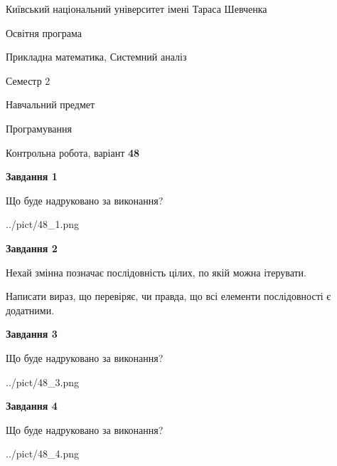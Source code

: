 \documentclass[12pt, ukrainian]{article}
\begin{document}
{{\begin {small}\par
{ \center  Київський національний університет імені Тараса Шевченка \par}
{\parbox {5 cm}{Освітня програма \hfill}{\parbox {8 cm}{Прикладна математика, Системний аналіз \hfill}}\parbox {5 cm}{\hfill Семестр 2}}\par
{\parbox {5 cm} {Навчальний предмет \hfill}\parbox {7 cm}{Програмування \hfill}\parbox {6cm}{\hfill}\par}\vspace{-7pt} \end{small}}{\center Контрольна робота, варіант  \No \textbf
{ 48 }\par}}
{
\begin {large}
{\begin {center}\textbf{Завдання 1}\end {center}}\par
Що буде надруковано за виконання?\par\par
\begin{center}
	{../pict/48_1.png}
\end{center}
\newpage

{\begin {center}\textbf{Завдання 2}\end {center}}\par
Нехай змінна  позначає послідовність цілих, по якій можна ітерувати.

Написати вираз, що перевіряє, чи правда, що всі елементи послідовності є додатни\-ми.\par
\newpage

{\begin {center}\textbf{Завдання 3}\end {center}}\par
Що буде надруковано за виконання?
\begin{center}
	{../pict/48_3.png}
\end{center}
\newpage

{\begin {center}\textbf{Завдання 4}\end {center}}\par
Що буде надруковано за виконання?\par
\begin{center}
	{../pict/48_4.png}
\end{center}
\newpage


\end{large}}
\end{document}
